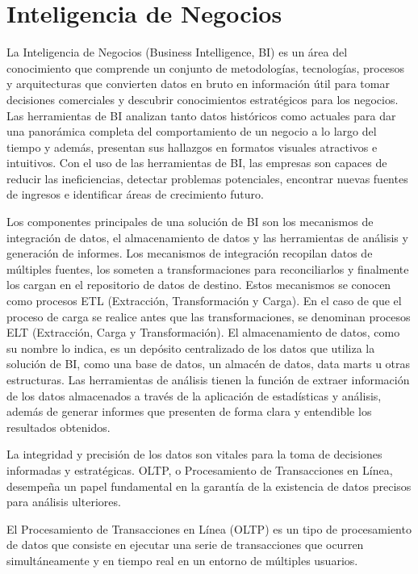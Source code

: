 \section{Inteligencia de Negocios}\label{section:bi}

La Inteligencia de Negocios (Business Intelligence, BI) es un \'area del conocimiento que comprende un conjunto de metodologías, 
tecnologías, procesos y arquitecturas que convierten datos 
en bruto en información útil para tomar decisiones comerciales y descubrir conocimientos estratégicos para los negocios. 
Las herramientas de BI analizan tanto datos históricos como actuales para dar una panor\'amica completa del comportamiento 
de un negocio a lo largo del tiempo y adem\'as, presentan sus hallazgos en formatos visuales atractivos e intuitivos. 
Con el uso de las herramientas de BI, las empresas son capaces de reducir las ineficiencias, detectar problemas potenciales, 
encontrar nuevas fuentes de ingresos e identificar áreas de crecimiento futuro.

Los componentes principales de una solución de BI son los mecanismos de integración de datos, el almacenamiento de datos y 
las herramientas de análisis y generaci\'on de informes\cite{lloyd2011identifying}. Los mecanismos de integración recopilan datos de múltiples fuentes, 
los someten a transformaciones para reconciliarlos y finalmente los cargan en el repositorio de datos de destino. Estos mecanismos se 
conocen como procesos ETL (Extracción, Transformación y Carga). En el caso de que el proceso de carga se realice antes que las transformaciones, 
se denominan procesos ELT (Extracción, Carga y Transformación). 
El almacenamiento de datos, como su nombre lo indica, es un depósito centralizado de los datos que utiliza la solución
de BI, como una base de datos, un almac\'en de datos, data marts u otras estructuras. Las herramientas de análisis tienen la función de extraer 
información de los datos almacenados a través de la aplicación de estadísticas y análisis, adem\'as de generar 
informes que presenten de forma clara y entendible los resultados obtenidos.

La integridad y precisión de los datos son vitales para la toma de decisiones informadas y estratégicas. 
OLTP, o Procesamiento de Transacciones en Línea, desempeña un papel fundamental en la garantía de la existencia de 
datos precisos para análisis ulteriores. 

El Procesamiento de Transacciones en Línea (OLTP) es un 
tipo de procesamiento de datos que consiste en ejecutar una serie de transacciones que ocurren simultáneamente y en 
tiempo real en un entorno de múltiples usuarios\cite{harizopoulos2018oltp}.


